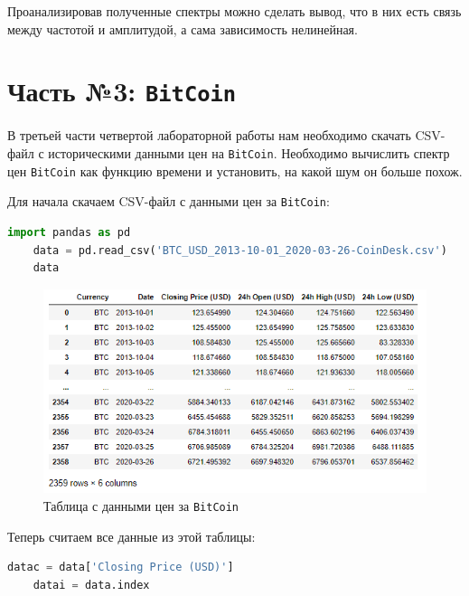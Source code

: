 \documentclass[a4paper]{article}
\begin{document}
            Проанализировав полученные спектры можно сделать вывод, что в них есть связь между частотой и амплитудой, а сама зависимость нелинейная.

    \newpage
        \section{Часть №3: \texttt{BitCoin}}
            В третьей части четвертой лабораторной работы нам необходимо скачать CSV-файл с историческими данными цен на \texttt{BitCoin}. Необходимо вычислить спектр цен \texttt{BitCoin} как функцию времени и установить, на какой шум он больше похож.
            
            Для начала скачаем  CSV-файл с данными цен за \texttt{BitCoin}:
            
\begin{lstlisting}[language=Python, caption= Получение таблицы с данными цен за \texttt{BitCoin}]
    import pandas as pd
    data = pd.read_csv('BTC_USD_2013-10-01_2020-03-26-CoinDesk.csv')
    data
\end{lstlisting}               
            
            \begin{figure}[H]
                \centering
                \includegraphics[width=\textwidth]{ex_3_bitcoin_table.png}
                \caption{Таблица с данными цен за \texttt{BitCoin}}
                \label{fig:ex_3_bitcoin_table}
            \end{figure}
            
            Теперь считаем все данные из этой таблицы:
            
\begin{lstlisting}[language=Python, caption= Получение данных из таблицы]
    datac = data['Closing Price (USD)']
    datai = data.index
\end{lstlisting}  
            
\end{document}
